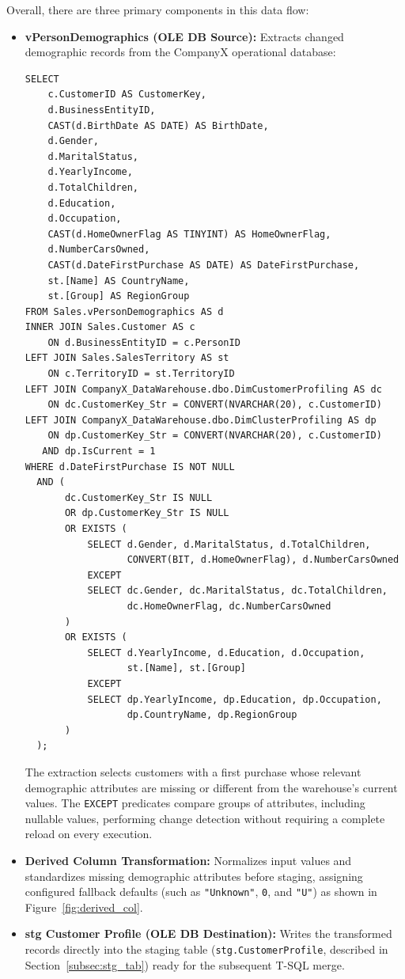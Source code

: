 Overall, there are three primary components in this data flow:
\begin{itemize}
    \item \textbf{vPersonDemographics (OLE DB Source):} Extracts changed demographic records from the CompanyX operational database:
    \begin{lstlisting}[caption={Table Selection}, label={lst:tab_select}]
SELECT
    c.CustomerID AS CustomerKey,
    d.BusinessEntityID,
    CAST(d.BirthDate AS DATE) AS BirthDate,
    d.Gender,
    d.MaritalStatus,
    d.YearlyIncome,
    d.TotalChildren,
    d.Education,
    d.Occupation,
    CAST(d.HomeOwnerFlag AS TINYINT) AS HomeOwnerFlag,
    d.NumberCarsOwned,
    CAST(d.DateFirstPurchase AS DATE) AS DateFirstPurchase,
    st.[Name] AS CountryName,
    st.[Group] AS RegionGroup
FROM Sales.vPersonDemographics AS d
INNER JOIN Sales.Customer AS c
    ON d.BusinessEntityID = c.PersonID
LEFT JOIN Sales.SalesTerritory AS st
    ON c.TerritoryID = st.TerritoryID
LEFT JOIN CompanyX_DataWarehouse.dbo.DimCustomerProfiling AS dc
    ON dc.CustomerKey_Str = CONVERT(NVARCHAR(20), c.CustomerID)
LEFT JOIN CompanyX_DataWarehouse.dbo.DimClusterProfiling AS dp
    ON dp.CustomerKey_Str = CONVERT(NVARCHAR(20), c.CustomerID)
   AND dp.IsCurrent = 1
WHERE d.DateFirstPurchase IS NOT NULL
  AND (
       dc.CustomerKey_Str IS NULL
       OR dp.CustomerKey_Str IS NULL
       OR EXISTS (
           SELECT d.Gender, d.MaritalStatus, d.TotalChildren,
                  CONVERT(BIT, d.HomeOwnerFlag), d.NumberCarsOwned
           EXCEPT
           SELECT dc.Gender, dc.MaritalStatus, dc.TotalChildren,
                  dc.HomeOwnerFlag, dc.NumberCarsOwned
       )
       OR EXISTS (
           SELECT d.YearlyIncome, d.Education, d.Occupation,
                  st.[Name], st.[Group]
           EXCEPT
           SELECT dp.YearlyIncome, dp.Education, dp.Occupation,
                  dp.CountryName, dp.RegionGroup
       )
  );
    \end{lstlisting}
    The extraction selects customers with a first purchase whose relevant demographic attributes are missing or different from the warehouse’s current values. The \texttt{EXCEPT} predicates compare groups of attributes, including nullable values, performing change detection without requiring a complete reload on every execution.

    \item \textbf{Derived Column Transformation:} Normalizes input values and standardizes missing demographic attributes before staging, assigning configured fallback defaults (such as \texttt{"Unknown"}, \texttt{0}, and \texttt{"U"}) as shown in Figure~\ref{fig:derived_col}.

    \item \textbf{stg Customer Profile (OLE DB Destination):} Writes the transformed records directly into the staging table (\texttt{stg.CustomerProfile}, described in Section~\ref{subsec:stg_tab}) ready for the subsequent T-SQL merge.
\end{itemize}

